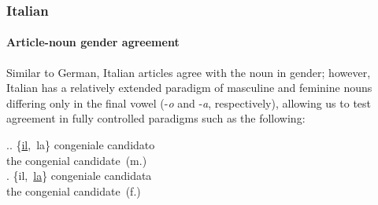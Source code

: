 
\subsubsection{Italian} %

\paragraph{Article-noun gender agreement}

Similar to German, Italian articles agree with the noun in gender;
however, Italian has a relatively extended paradigm of masculine and
feminine nouns differing only in the final vowel (-\emph{o} and
-\emph{a}, respectively), allowing us to test agreement in fully
controlled paradigms such as the following:

\ex.\ag. \{\underline{il},\ la\}  congeniale  candidato \\
the congenial candidate\ (m.) \\
\bg.  \{il,\ \underline{la}\}  congeniale  candidata \\
the congenial candidate\ (f.) \\

